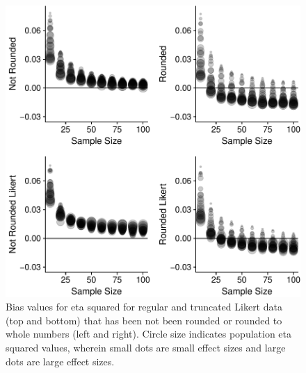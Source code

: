 \documentclass[english,man]{apa6}
\theoremstyle{definition}
\theoremstyle{definition}
\theoremstyle{definition}
\theoremstyle{remark}
\begin{document}
\begin{figure}
\centering
\includegraphics{buchanan_scofield_version2_files/figure-latex/across-graph-bias-1.pdf}
\caption{\label{fig:across-graph-bias}Bias values for eta squared for
regular and truncated Likert data (top and bottom) that has been not
been rounded or rounded to whole numbers (left and right). Circle size
indicates population eta squared values, wherein small dots are small
effect sizes and large dots are large effect sizes.}
\end{figure}
\end{document}
